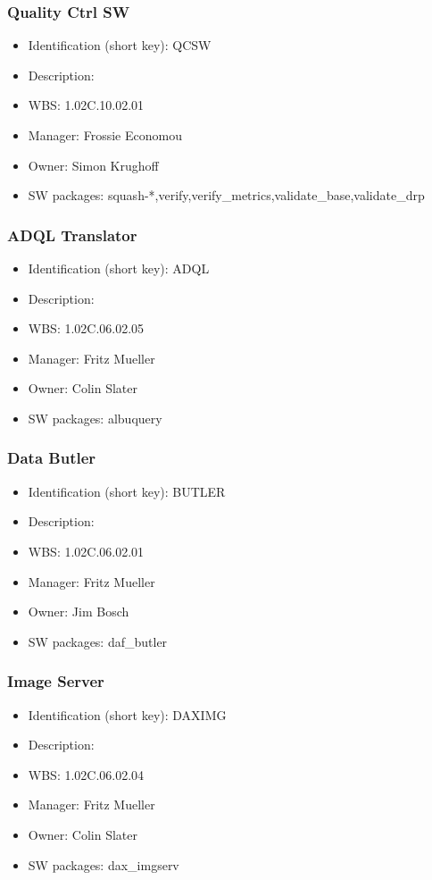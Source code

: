 \subsubsection{Quality Ctrl SW}\label{sect:QCSW}
\begin{itemize}
\item Identification (short key): QCSW
\item Description: 
\item WBS: 1.02C.10.02.01
\item Manager: Frossie Economou
\item Owner: Simon Krughoff
\item SW packages: squash-*,verify,verify\_metrics,validate\_base,validate\_drp
\end{itemize}

\subsubsection{ADQL Translator}\label{sect:ADQL}
\begin{itemize}
\item Identification (short key): ADQL
\item Description: 
\item WBS: 1.02C.06.02.05
\item Manager: Fritz Mueller
\item Owner: Colin Slater
\item SW packages: albuquery
\end{itemize}

\subsubsection{Data Butler}\label{sect:BUTLER}
\begin{itemize}
\item Identification (short key): BUTLER
\item Description: 
\item WBS: 1.02C.06.02.01
\item Manager: Fritz Mueller
\item Owner: Jim Bosch
\item SW packages: daf\_butler
\end{itemize}

\subsubsection{Image Server}\label{sect:DAXIMG}
\begin{itemize}
\item Identification (short key): DAXIMG
\item Description: 
\item WBS: 1.02C.06.02.04
\item Manager: Fritz Mueller
\item Owner: Colin Slater
\item SW packages: dax\_imgserv
\end{itemize}

